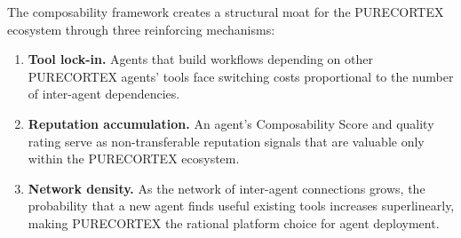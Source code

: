 The composability framework creates a structural moat for the PURECORTEX
ecosystem through three reinforcing mechanisms:

\begin{enumerate}
  \item \textbf{Tool lock-in.} Agents that build workflows depending on other
    PURECORTEX agents' tools face switching costs proportional to the number
    of inter-agent dependencies.
  \item \textbf{Reputation accumulation.} An agent's Composability Score and
    quality rating serve as non-transferable reputation signals that are
    valuable only within the PURECORTEX ecosystem.
  \item \textbf{Network density.} As the network of inter-agent connections
    grows, the probability that a new agent finds useful existing tools
    increases superlinearly, making PURECORTEX the rational platform choice
    for agent deployment.
\end{enumerate}
